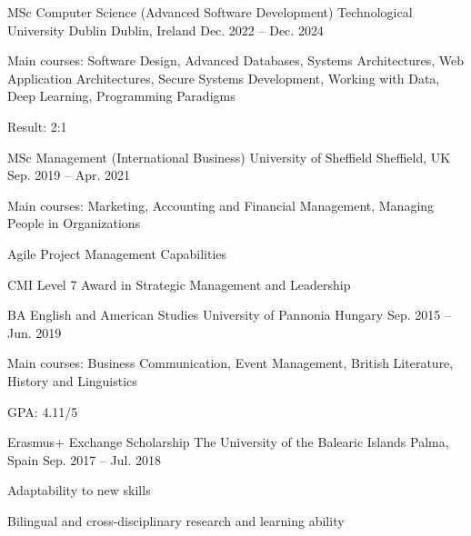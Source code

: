 
\begin{cventries}

  \cventry
    {MSc Computer Science (Advanced Software Development)} %
    {Technological University Dublin} %
    {Dublin, Ireland} %
    {Dec. 2022 -- Dec. 2024}
    {
      \begin{cvitems}
        \item {Main courses: Software Design, Advanced Databases, Systems Architectures, Web Application Architectures, Secure Systems Development, Working with Data, Deep Learning, Programming Paradigms}
        \item {Result: 2:1}
      \end{cvitems}
    }

  \cventry
    {MSc Management (International Business)} %
    {University of Sheffield} %
    {Sheffield, UK} %
    {Sep. 2019 -- Apr. 2021}
    {
      \begin{cvitems}
        \item {Main courses: Marketing, Accounting and Financial Management, Managing People in Organizations}
        \item {Agile Project Management Capabilities}
        \item {CMI Level 7 Award in Strategic Management and Leadership}
      \end{cvitems}
    }

  \cventry
    {BA English and American Studies} %
    {University of Pannonia} %
    {Hungary} %
    {Sep. 2015 -- Jun. 2019}
    {
      \begin{cvitems}
        \item {Main courses: Business Communication, Event Management, British Literature, History and Linguistics}
        \item {GPA: 4.11/5}
      \end{cvitems}
    }

  \cventry
    {Erasmus+ Exchange Scholarship} %
    {The University of the Balearic Islands} %
    {Palma, Spain} %
    {Sep. 2017 -- Jul. 2018}
    {
      \begin{cvitems}
        \item {Adaptability to new skills}
        \item {Bilingual and cross-disciplinary research and learning ability}
      \end{cvitems}
    }

\end{cventries}
